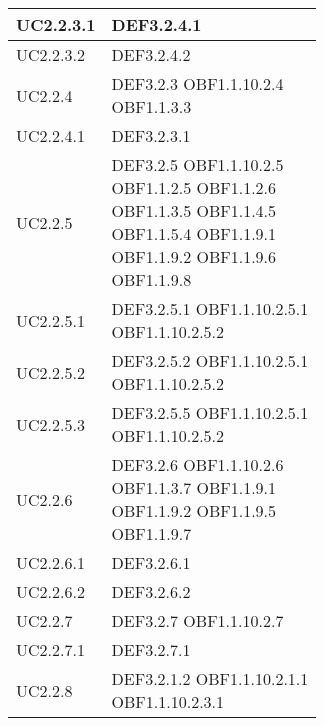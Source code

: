 \documentclass{scalatekids-article}
\begin{document}
\begin{longtable}[H]{|p{5.5cm}|p{5.5cm}|}
\hline
UC2.2.3.1 & \multiLineCell[t]{DEF3.2.4.1\\}\\
\hline
UC2.2.3.2 & \multiLineCell[t]{DEF3.2.4.2\\}\\
\hline
UC2.2.4 & \multiLineCell[t]{DEF3.2.3 OBF1.1.10.2.4\\OBF1.1.3.3\\}\\
\hline
UC2.2.4.1 & \multiLineCell[t]{DEF3.2.3.1\\}\\
\hline
UC2.2.5 & \multiLineCell[t]{DEF3.2.5 OBF1.1.10.2.5\\OBF1.1.2.5 OBF1.1.2.6\\OBF1.1.3.5 OBF1.1.4.5\\OBF1.1.5.4 OBF1.1.9.1\\OBF1.1.9.2 OBF1.1.9.6\\OBF1.1.9.8}\\
\hline
UC2.2.5.1 & \multiLineCell[t]{DEF3.2.5.1 OBF1.1.10.2.5.1\\OBF1.1.10.2.5.2\\}\\
\hline
UC2.2.5.2 & \multiLineCell[t]{DEF3.2.5.2 OBF1.1.10.2.5.1\\OBF1.1.10.2.5.2\\}\\
\hline
UC2.2.5.3 & \multiLineCell[t]{DEF3.2.5.5 OBF1.1.10.2.5.1\\OBF1.1.10.2.5.2\\}\\
\hline
UC2.2.6 & \multiLineCell[t]{DEF3.2.6 OBF1.1.10.2.6\\OBF1.1.3.7 OBF1.1.9.1\\OBF1.1.9.2 OBF1.1.9.5\\OBF1.1.9.7}\\
\hline
UC2.2.6.1 & \multiLineCell[t]{DEF3.2.6.1\\}\\
\hline
UC2.2.6.2 & \multiLineCell[t]{DEF3.2.6.2\\}\\
\hline
UC2.2.7 & \multiLineCell[t]{DEF3.2.7 OBF1.1.10.2.7\\}\\
\hline
UC2.2.7.1 & \multiLineCell[t]{DEF3.2.7.1\\}\\
\hline
UC2.2.8 & \multiLineCell[t]{DEF3.2.1.2 OBF1.1.10.2.1.1\\OBF1.1.10.2.3.1}\\

\end{longtable}
\end{document}
